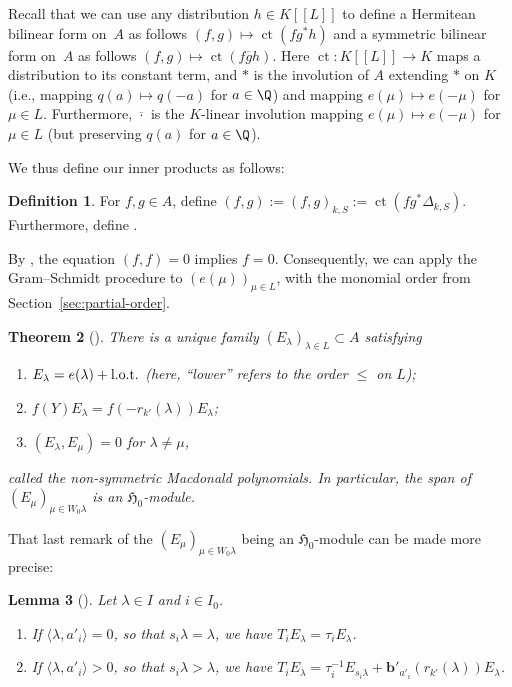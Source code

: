 \documentclass[10pt,a4paper]{amsart}
\newtheorem{Theorem}{Theorem}[section]
\newtheorem{Lemma}[Theorem]{Lemma}
\theoremstyle{definition}
\newtheorem{Definition}[Theorem]{Definition}
\DeclareMathOperator{\ct}{ct}
\numberwithin{equation}{section}
\begin{document}
Recall that we can use any distribution $h\in K[[L]]$
to define a Hermitean bilinear form on~$A$ as follows
$
 (f,g) \mapsto \ct(fg^* h)
$
and a symmetric bilinear form on~$A$ as follows
$
 (f,g)\mapsto \ct(f\overline{g}h)$.
Here $\ct\colon K[[L]]\to K$ maps a distribution to its constant term, and $*$ is the involution of $A$ extending $*$ on $K$
(i.e., mapping $q(a)\mapsto q(-a)$ for $a\in\Q$) and mapping
$e(\mu)\mapsto e(-\mu)$ for $\mu\in L$.
Furthermore, $\overline{\cdot}$ is the $K$-linear
involution mapping $e(\mu)\mapsto e(-\mu)$ for $\mu\in L$ (but preserving $q(a)$ for $a\in\Q$).

We thus define our inner products as follows:
\begin{Definition}\label{def-inner-product}
 For $f,g\in A$, define
$
 (f,g):= (f,g)_{k,S} := \ct(fg^*\Delta_{k,S})$.
 Furthermore, define
\smash{$
 (f,g)_1 := \frac{(f,g)}{(1,1)}
 = \ct(fg^*\Delta_{k,S,1})\in K$}.
\end{Definition}

By \cite[Section~5.1.20]{macdonald}, the equation $(f,f)=0$ implies $f=0$.
Consequently, we can apply the Gram--Schmidt procedure
to $(e(\mu))_{\mu\in L}$, with the monomial order from Section~\ref{sec:partial-order}.
\begin{Theorem}[{\cite[Section~5.2.1ff]{macdonald}}]\label{sec:thm-E}
 There is a unique family $(E_\lambda)_{\lambda\in L}\subset A$ satisfying
 \begin{enumerate}\itemsep=0pt
 \item[$(i)$] $E_{\lambda} = e(\lambda) + \text{\rm l.o.t.}$ {\rm(}here, ``lower'' refers
 to the order $\le$ on $L${\rm)};
 \item[$(ii)$] $f(Y) E_\lambda = f(-r_{k'}(\lambda)) E_\lambda$;
 \item[$(iii)$] $(E_\lambda, E_\mu)=0$ for $\lambda\ne\mu$,
 \end{enumerate}
 called the non-symmetric Macdonald polynomials.
 In particular, the span of $(E_\mu)_{\mu\in W_0\lambda}$ is
 an $\mathfrak{H}_0$-module.
\end{Theorem}

That last remark of the $(E_\mu)_{\mu\in W_0\lambda}$ being an
$\mathfrak{H}_0$-module can be made more precise:
\begin{Lemma}[{\cite[Section~5.4.3f]{macdonald}}]\label{sec:lem-Ti-action-E}
 Let $\lambda\in I$ and $i\in I_0$.
 \begin{enumerate}\itemsep=0pt
 \item[$(i)$] If $\langle\lambda, a'_i\rangle=0$, so that $s_i\lambda=\lambda$,
 we have $T_iE_\lambda = \tau_i E_\lambda$.
 \item[$(ii)$] If $\langle\lambda, a'_i\rangle>0$, so that $s_i\lambda>\lambda$,
 we have $T_iE_\lambda = \tau_i^{-1} E_{s_i\lambda} + \bm{b}'_{a'_i}(r_{k'}(\lambda))E_\lambda$.
 \end{enumerate}
\end{Lemma}
\end{document}
